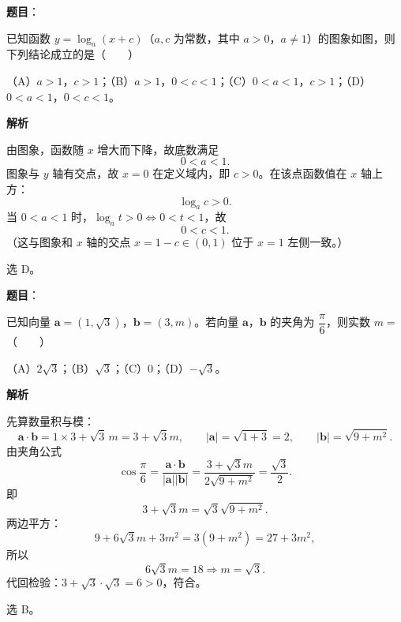 \begin{answer}

\textbf{题目}：

已知函数 $y=\log_a(x+c)$（$a,c$ 为常数，其中 $a>0$，$a\neq1$）的图象如图，则下列结论成立的是\mbox{（　　）}

（A）$a>1$，$c>1$；（B）$a>1$，$0<c<1$；（C）$0<a<1$，$c>1$；（D）$0<a<1$，$0<c<1$。
\nopagebreak[4]
\begin{center}\end{center}
\nopagebreak[4]
\textbf{解析}

由图象，函数随 $x$ 增大而下降，故底数满足
\nopagebreak[4]
\[0<a<1 .\]
图象与 $y$ 轴有交点，故 $x=0$ 在定义域内，即 $c>0$。在该点函数值在 $x$ 轴上方：
\nopagebreak[4]
\[\log_ac>0 .\]
当 $0<a<1$ 时，$\log_at>0\iff0<t<1$，故
\nopagebreak[4]
\[0<c<1 .\]
（这与图象和 $x$ 轴的交点 $x=1-c\in(0,1)$ 位于 $x=1$ 左侧一致。）

选 D。


\end{answer}
\begin{answer}

\textbf{题目}：

已知向量 $\boldsymbol a=(1,\sqrt3)$，$\boldsymbol b=(3,m)$。若向量 $\boldsymbol a$，$\boldsymbol b$ 的夹角为 $\dfrac\pi6$，则实数 $m=$\mbox{（　　）}

（A）$2\sqrt3$；（B）$\sqrt3$；（C）$0$；（D）$-\sqrt3$。

\textbf{解析}

先算数量积与模：
\nopagebreak[4]
\[\boldsymbol a\cdot\boldsymbol b=1\times3+\sqrt3\,m=3+\sqrt3m,\qquad
|\boldsymbol a|=\sqrt{1+3}=2,\qquad
|\boldsymbol b|=\sqrt{9+m^2}.\]
由夹角公式
\nopagebreak[4]
\[\cos\frac\pi6=\frac{\boldsymbol a\cdot\boldsymbol b}{|\boldsymbol a||\boldsymbol b|}
=\frac{3+\sqrt3m}{2\sqrt{9+m^2}}=\frac{\sqrt3}2 .\]
即
\nopagebreak[4]
\[3+\sqrt3m=\sqrt3\sqrt{9+m^2}.\]
两边平方：
\nopagebreak[4]
\[9+6\sqrt3m+3m^2=3(9+m^2)=27+3m^2,\]
所以
\nopagebreak[4]
\[6\sqrt3m=18\Longrightarrow m=\sqrt3 .\]
代回检验：$3+\sqrt3\cdot\sqrt3=6>0$，符合。

选 B。


\end{answer}
